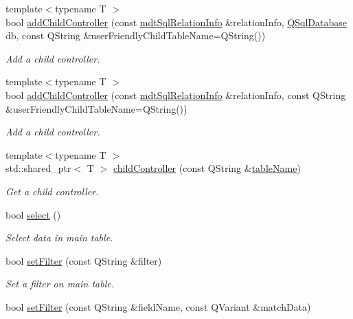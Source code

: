 \begin{DoxyCompactItemize}
{\footnotesize template$<$typename T $>$ }\\bool \hyperlink{classmdt_abstract_sql_table_controller_a448966fc2696cc2cef31f4663ccde662}{add\-Child\-Controller} (const \hyperlink{classmdt_sql_relation_info}{mdt\-Sql\-Relation\-Info} \&relation\-Info, \hyperlink{class_q_sql_database}{Q\-Sql\-Database} db, const Q\-String \&user\-Friendly\-Child\-Table\-Name=Q\-String())
\begin{DoxyCompactList}\small\item\em Add a child controller. \end{DoxyCompactList}\item 
{\footnotesize template$<$typename T $>$ }\\bool \hyperlink{classmdt_abstract_sql_table_controller_a9ca5ec3bd1c98e7b5576de86712f220b}{add\-Child\-Controller} (const \hyperlink{classmdt_sql_relation_info}{mdt\-Sql\-Relation\-Info} \&relation\-Info, const Q\-String \&user\-Friendly\-Child\-Table\-Name=Q\-String())
\begin{DoxyCompactList}\small\item\em Add a child controller. \end{DoxyCompactList}\item 
{\footnotesize template$<$typename T $>$ }\\std\-::shared\-\_\-ptr$<$ T $>$ \hyperlink{classmdt_abstract_sql_table_controller_a4096d1eca87219a9abe4ab3e90943d81}{child\-Controller} (const Q\-String \&\hyperlink{classmdt_abstract_sql_table_controller_aaf864d069aeb74068b6daa747b740944}{table\-Name})
\begin{DoxyCompactList}\small\item\em Get a child controller. \end{DoxyCompactList}\item 
bool \hyperlink{classmdt_abstract_sql_table_controller_ae26ede862ac54ece9243b264ea22cefb}{select} ()
\begin{DoxyCompactList}\small\item\em Select data in main table. \end{DoxyCompactList}\item 
bool \hyperlink{classmdt_abstract_sql_table_controller_a28b24065dc465fdc0944464708adf63f}{set\-Filter} (const Q\-String \&filter)
\begin{DoxyCompactList}\small\item\em Set a filter on main table. \end{DoxyCompactList}\item 
bool \hyperlink{classmdt_abstract_sql_table_controller_aab3bc0fe028e133fe3f79a16907b41f5}{set\-Filter} (const Q\-String \&field\-Name, const Q\-Variant \&match\-Data)

\end{DoxyCompactItemize}
